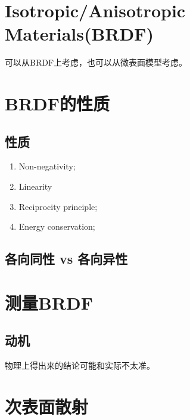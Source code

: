\section{Isotropic/Anisotropic Materials(BRDF)}

可以从BRDF上考虑，也可以从微表面模型考虑。

\section{BRDF的性质}

\subsection*{性质}

\begin{enumerate}
    \item Non-negativity;
    \item Linearity
    \item Reciprocity principle;
    \item Energy conservation;
\end{enumerate}

\subsection*{各向同性 vs 各向异性}

\section{测量BRDF}

\subsection*{动机}

物理上得出来的结论可能和实际不太准。

\section{次表面散射}

